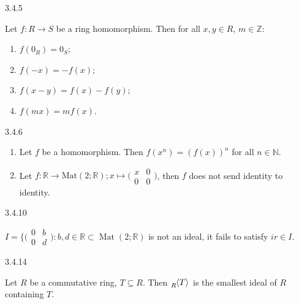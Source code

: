 \documentclass[10pt]{article} %
\DeclareMathOperator{\Mat}{Mat}
\begin{document}
\begin{multicols}{3}
\begin{lemma}{3.4.5}{}

    Let $f: R \to S$ be a ring homomorphism. Then for all $x,y \in R$, $m \in \mathbb{Z}$:

        \begin{enumerate}[(1)]
            \setlength{\parskip}{0em}
            \item $f(0_R) = 0_S$;
            \item $f(-x) = -f(x)$;
            \item $f(x-y) = f(x)-f(y)$;
            \item $f(mx) = mf(x)$.
        \end{enumerate}

\end{lemma}

\begin{remark}{3.4.6}{}

    \begin{enumerate}[(1)]
        \setlength{\parskip}{0em}
        \item Let $f$ be a homomorphism. Then $f(x^n)=(f(x))^n$ for all $n \in \mathbb{N}$.
        \item Let $f: \mathbb{R} \to \textrm{Mat}(2;\mathbb{R}); x \mapsto \bigl( \begin{smallmatrix}x & 0\\ 0 & 0\end{smallmatrix}\bigr)$, then $f$ does not send identity to identity.
    \end{enumerate}

\end{remark}

\begin{example}{3.4.10}{}

    $I = \{ \bigl( \begin{smallmatrix}0 & b\\ 0 & d\end{smallmatrix}\bigr): b,d \in \mathbb{R} \subset \Mat(2;\mathbb{R})$ is not an ideal, it fails to satisfy $ir \in I$.

\end{example}

\begin{proposition}{3.4.14}{}

    Let $R$ be a commutative ring, $T \subseteq R$. Then $\tensor[_R]{\langle T \rangle}{}$ is the smallest ideal of $R$ containing $T$.


\end{proposition}
\end{multicols}
\end{document}
